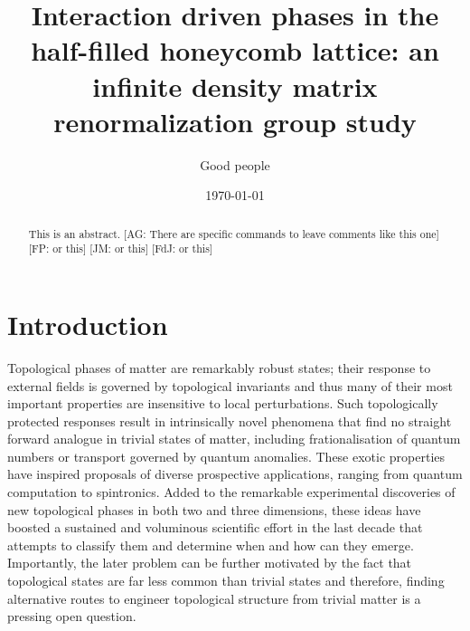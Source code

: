 \documentclass[aps,prx,10pt,twocolumn,floatfix,superscriptaddress,showpacs,numerical,footinbib]{revtex4-1}
\newcommand{\noteAG}[1]{{\color{blue} [AG: #1]}}
\newcommand{\noteFP}[1]{{\color{magenta} [FP: #1]}}
\newcommand{\noteJM}[1]{{\color{red} [JM: #1]}}
\newcommand{\noteFdJ}[1]{{\color{cyan} [FdJ: #1]}}
\begin{document}
%
\title{Interaction driven phases in the half-filled honeycomb lattice: an infinite density matrix renormalization group study}
%
\author{Good people}
%
\date{\today}
%
\begin{abstract}
%
This is an abstract.
%
\noteAG{There are specific commands to leave comments like this one}\noteFP{or this}\noteJM{or this}\noteFdJ{or this}
%
\end{abstract}
%
\maketitle
%

\section{Introduction}
%
Topological phases of matter are remarkably robust states; their response to external fields is
governed by topological invariants and thus many of their most important properties are insensitive to local perturbations.
%
Such topologically protected responses result in intrinsically novel phenomena that find no straight forward analogue in trivial states
of matter, including frationalisation of quantum numbers or transport governed by quantum anomalies.
%
These exotic properties have inspired proposals of diverse prospective applications, ranging from quantum computation to spintronics.
%
Added to the remarkable experimental discoveries of new topological phases in both two and three dimensions,
these ideas have boosted a sustained and voluminous scientific effort in the last decade that attempts to classify them and determine when and how can they emerge.
%
Importantly, the later problem can be further motivated by the fact that topological states are far less common than trivial states
and therefore, finding alternative routes to engineer topological structure from trivial matter is a pressing open question.\\
%
\end{document}
